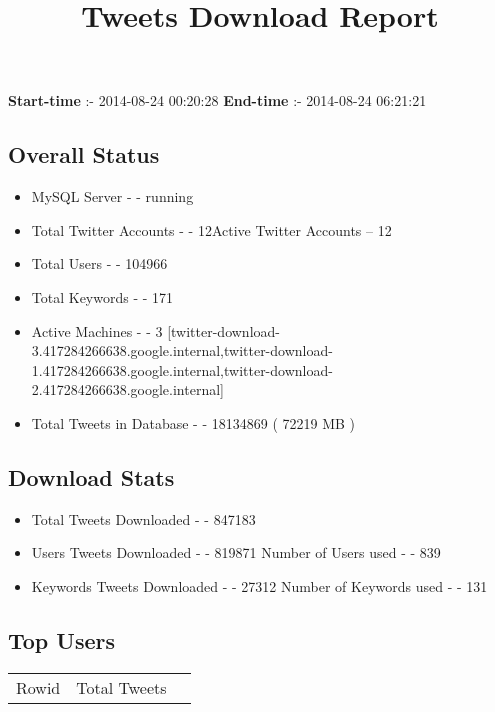 \documentclass{article}\usepackage[T1]{fontenc}
\begin{document}
\title{\textbf{Tweets Download Report}}
               \date{}
                \maketitle
               \centerline{\textbf{Start-time} :- 2014-08-24 00:20:28 \hspace{40pt} \textbf{End-time} :- 2014-08-24 06:21:21}               \subsection*{Overall Status}                \begin{itemize}                \item MySQL Server - - running               \item Total Twitter Accounts - - 12\newline Active Twitter Accounts -- 12               \item Total Users - - 104966               \item Total Keywords - - 171               \item Active Machines - - 3 [twitter-download-3.417284266638.google.internal,twitter-download-1.417284266638.google.internal,twitter-download-2.417284266638.google.internal]               \item Total Tweets in Database - - 18134869 ( 72219 MB )               \end{itemize}               \subsection*{Download Stats}                \begin{itemize}                \item Total Tweets Downloaded - - 847183               \item Users Tweets Downloaded - - 819871 \newline Number of Users used - - 839               \item Keywords Tweets Downloaded - - 27312 \newline Number of Keywords used - - 131              \end{itemize}              \subsection*{Top Users}\begin{tabular}{|c|c|c|}         \hline         Rowid & Total Tweets \\ 

\end{tabular}
\end{document}
